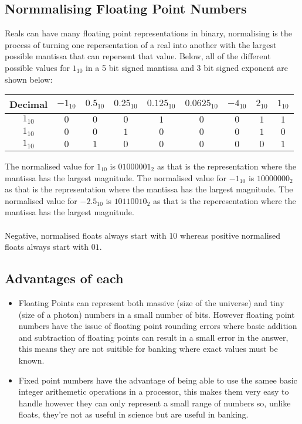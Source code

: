 \documentclass{article}
\begin{document}
\subsection{Normmalising Floating Point Numbers}
Reals can have many floating point representations in binary, normalising is the process of turning one
repersentation of a real into another with the largest possible mantissa that can repersent that value.
Below, all of the different possible values for $1_{10}$ in a 5 bit signed mantissa and 3 bit signed exponent
are shown below:

\begin{center}
  \begin{tabular}{ | c | c | c | c | c | c | | c | c | c |}
    \hline
    Decimal & $-1_{10}$ & $0.5_{10}$ & $0.25_{10}$ & $0.125_{10}$ & $0.0625_{10}$ & $-4_{10}$ & $2_{10}$ & $1_{10}$\\ \hline
    $1_{10}$ & $0$ & $0$ & $0$ & $1$ & $0$ & $0$ & $1$ & $1$\\ \hline
    $1_{10}$ & $0$ & $0$ & $1$ & $0$ & $0$ & $0$ & $1$ & $0$\\ \hline
    $1_{10}$ & $0$ & $1$ & $0$ & $0$ & $0$ & $0$ & $0$ & $1$\\ 
    \hline
  \end{tabular}
\end{center}
The normalised value for $1_{10}$ is $01000001_2$ as that is the representation where the mantissa has the largest magnitude.
The normalised value for $-1_{10}$ is $10000000_2$ as that is the representation where the mantissa has the largest magnitude.
The normalised value for $-2.5_{10}$ is $10110010_2$ as that is the reperesentation where the mantissa has the largest magnitude.
\\\\
Negative, normalised floats always start with $10$ whereas positive normalised floats always start with $01$.
\subsection{Advantages of each}
\begin{itemize}
	\item Floating Points can represent both massive (size of the universe) and tiny (size of a photon) numbers
		in a small number of bits. However floating point numbers have the issue of floating point
		rounding errors where basic addition and subtraction of floating points can result in a small error in
		the answer, this means they are not suitible for banking where exact values must be known.
	\item Fixed point numbers have the advantage of being able to use the samee basic integer arithemetic operations
		in a processor, this makes them very easy to handle however they can only represent a small range of numbers
		so, unlike floats, they're not as useful in science but are useful in banking.
\end{itemize}
\end{document}
